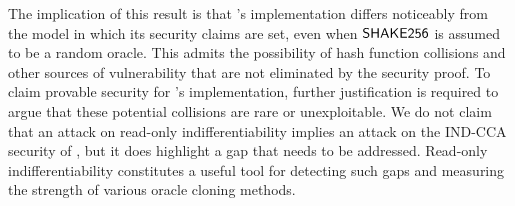 The implication of this result is that 's implementation differs noticeably from the model in which its security claims are set, even when $\mathsf{SHAKE256}$ is assumed to be a random oracle.
This admits the possibility of hash function collisions and other sources of vulnerability that are not eliminated by the security proof. 
To claim provable security for 's implementation, further justification is required to argue that these potential collisions are rare or unexploitable. 
We do not claim that an attack on read-only indifferentiability implies an attack on the IND-CCA security of , but it does highlight a gap that needs to be addressed. 
Read-only indifferentiability constitutes a useful tool for detecting such gaps and measuring the strength of various oracle cloning methods. 
